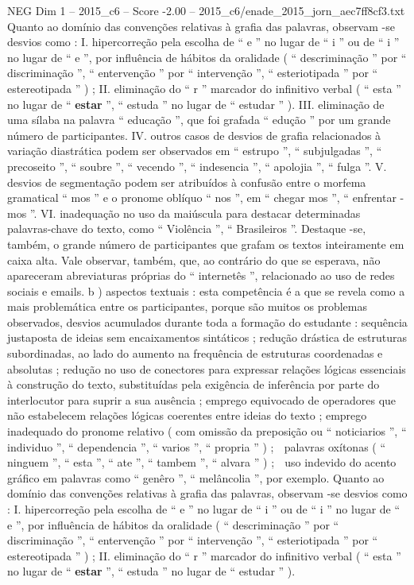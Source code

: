\begin{textsample}{NEG Dim 1 – 2015\_c6 – Score -2.00 – 2015\_c6/enade\_2015\_jorn\_aec7ff8cf3.txt}
Quanto ao domínio das convenções relativas à grafia das palavras, observam -se desvios como : I. hipercorreção pela escolha de “ e ” no lugar de “ i ” ou de “ i ” no lugar de “ e ”, por influência de hábitos da oralidade ( “ descriminação ” por “ discriminação ”, “ entervenção ” por “ intervenção ”, “ esteriotipada ” por “ estereotipada ” ) ; II. eliminação do “ r ” marcador do infinitivo verbal ( “ esta ” no lugar de “ \textbf{estar} ”, “ estuda ” no lugar de “ estudar ” ).
III. eliminação de uma sílaba na palavra “ educação ”, que foi grafada “ edução ” por um grande número de participantes.
IV. outros casos de desvios de grafia relacionados à variação diastrática podem ser observados em “ estrupo ”, “ subjulgadas ”, “ precoseito ”, “ soubre ”, “ vecendo ”, “ indesencia ”, “ apolojia ”, “ fulga ”.
V. desvios de segmentação podem ser atribuídos à confusão entre o morfema gramatical “ mos ” e o pronome oblíquo “ nos ”, em “ chegar mos ”, “ enfrentar -mos ”.
VI. inadequação no uso da maiúscula para destacar determinadas palavras-chave do texto, como “ Violência ”, “ Brasileiros ”.
Destaque -se, também, o grande número de participantes que grafam os textos inteiramente em caixa alta.
Vale observar, também, que, ao contrário do que se esperava, não apareceram abreviaturas próprias do “ internetês ”, relacionado ao uso de redes sociais e emails. b ) aspectos textuais : esta competência é a que se revela como a mais problemática entre os participantes, porque são muitos os problemas observados, desvios acumulados durante toda a formação do estudante : sequência justaposta de ideias sem encaixamentos sintáticos ; redução drástica de estruturas subordinadas, ao lado do aumento na frequência de estruturas coordenadas e absolutas ; redução no uso de conectores para expressar relações lógicas essenciais à construção do texto, substituídas pela exigência de inferência por parte do interlocutor para suprir a sua ausência ; emprego equivocado de operadores que não estabelecem relações lógicas coerentes entre ideias do texto ; emprego inadequado do pronome relativo ( com omissão da preposição ou “ noticiarios ”, “ individuo ”, “ dependencia ”, “ varios ”, “ propria ” ) ;  palavras oxítonas ( “ ninguem ”, “ esta ”, “ ate ”, “ tambem ”, “ alvara ” ) ;  uso indevido do acento gráfico em palavras como “ genêro ”, “ melâncolia ”, por exemplo.
Quanto ao domínio das convenções relativas à grafia das palavras, observam -se desvios como : I. hipercorreção pela escolha de “ e ” no lugar de “ i ” ou de “ i ” no lugar de “ e ”, por influência de hábitos da oralidade ( “ descriminação ” por “ discriminação ”, “ entervenção ” por “ intervenção ”, “ esteriotipada ” por “ estereotipada ” ) ; II. eliminação do “ r ” marcador do infinitivo verbal ( “ esta ” no lugar de “ \textbf{estar} ”, “ estuda ” no lugar de “ estudar ” ).

\end{textsample}

